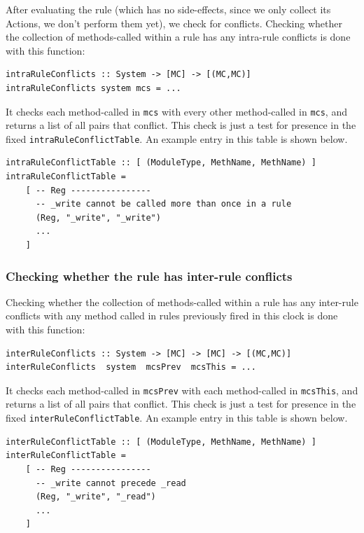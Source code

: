 \documentclass[11pt]{article}
\newcommand{\term}[1]{\texttt{#1}}
\begin{document}
After evaluating the rule (which has no side-effects, since we only
collect its Actions, we don't perform them yet), we check for
conflicts.  Checking whether the collection of methods-called within a
rule has any intra-rule conflicts is done with this function:

\begin{Verbatim}[frame=single, commandchars=\\\{\}]
intraRuleConflicts :: System -> [MC] -> [(MC,MC)]
intraRuleConflicts system mcs = ...
\end{Verbatim}

It checks each method-called in \term{mcs} with every other
method-called in \term{mcs}, and returns a list of all pairs that
conflict.  This check is just a test for presence in the fixed
\term{intraRuleConflictTable}.  An example entry in this table is
shown below.

\begin{Verbatim}[frame=single, commandchars=\\\{\}]
intraRuleConflictTable :: [ (ModuleType, MethName, MethName) ]
intraRuleConflictTable =
    [ -- Reg ----------------
      -- _write cannot be called more than once in a rule
      (Reg, "_write", "_write")
      ...
    ]
\end{Verbatim}


\subsubsection{Checking whether the rule has inter-rule conflicts}

Checking whether the collection of methods-called within a rule has
any inter-rule conflicts with any method called in rules previously
fired in this clock is done with this function:

\begin{Verbatim}[frame=single, commandchars=\\\{\}]
interRuleConflicts :: System -> [MC] -> [MC] -> [(MC,MC)]
interRuleConflicts  system  mcsPrev  mcsThis = ...
\end{Verbatim}

It checks each method-called in \term{mcsPrev} with each method-called
in \term{mcsThis}, and returns a list of all pairs that conflict.
This check is just a test for presence in the fixed
\term{interRuleConflictTable}.  An example entry in this table is
shown below.

\begin{Verbatim}[frame=single, commandchars=\\\{\}]
interRuleConflictTable :: [ (ModuleType, MethName, MethName) ]
interRuleConflictTable =
    [ -- Reg ----------------
      -- _write cannot precede _read
      (Reg, "_write", "_read")
      ...
    ]
\end{Verbatim}
\end{document}
